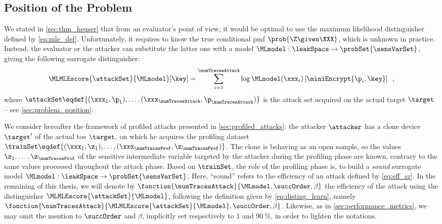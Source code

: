 \subsection{Position of the Problem}
\label{sec:pb_position}
We stated in \autoref{sec:thm_heuser} that from an evaluator's point of view, it would be optimal to use the maximum likelihood distinguisher defined by \autoref{eq:mle_def}.
Unfortunately, it requires to know the true conditional \gls{pmf} \(\prob{\Z \given \XXX}\), which is unknown in practice.
Instead, the evaluator or the attacker can substitute the latter one with a model \(\MLmodel: \leakSpace \rightarrow \probSet{\sensVarSet}\), giving the following surrogate distinguisher:
\begin{equation}
	\MLMLEscore{\attackSet}{\MLmodel}[\key] = \sum_{i=1}^{\numTracesAttack} \log \MLmodel(\xxx_i)\left[\miniEncrypt{\p_i, \key}\right] \enspace , 
	\label{eq:disting_learn}
\end{equation}
where \(\attackSet \eqdef \{(\xxx_1, \p_1), \ldots, (\xxx_{\numTracesAttack}, \p_{\numTracesAttack})\}\) is the attack set acquired on the actual target \(\target\) -- see \autoref{sec:problem_position}.

We consider hereafter the framework of profiled attacks presented in \autoref{sec:profiled_attacks}: the attacker \(\attacker\) has a clone device \(\target'\) of the actual \gls{toe} \(\target\), on which he acquires the profiling dataset \(\trainSet \eqdef \{(\xxx_1, \z_1), \ldots, (\xxx_{\numTracesProf},\z_{\numTracesProf})\}\).
The clone is behaving as an open sample, so the values \(\z_1, \ldots, \z_{\numTracesProf}\) of the sensitive intermediate variable targeted by the attacker during the profiling phase are known, contrary to the same values processed throughout the attack phase.
Based on \(\trainSet\), the role of the profiling phase is, to build a \emph{sound} surrogate model \(\MLmodel: \leakSpace \rightarrow \probSet{\sensVarSet}\).
Here, ``sound'' refers to the efficiency of an attack defined by \autoref{eq:eff_sr}.
In the remaining of this thesis, we will denote by \(\fonction{\numTracesAttack}{\MLmodel, \succOrder, \beta}\) the efficiency of the attack using the distinguisher \(\MLMLEscore{\attackSet}{\MLmodel}\), following the definition given by \autoref{eq:disting_learn}, namely \(\fonction{\numTracesAttack}{\MLMLEscore{\attackSet}{\MLmodel}, \succOrder, \beta}\).
Likewise, as in \autoref{sec:performance_metrics}, we may omit the mention to \(\succOrder\) and \(\beta\), implicitly set respectively to \(1\) and \(90~\%\), in order to lighten the notations.

